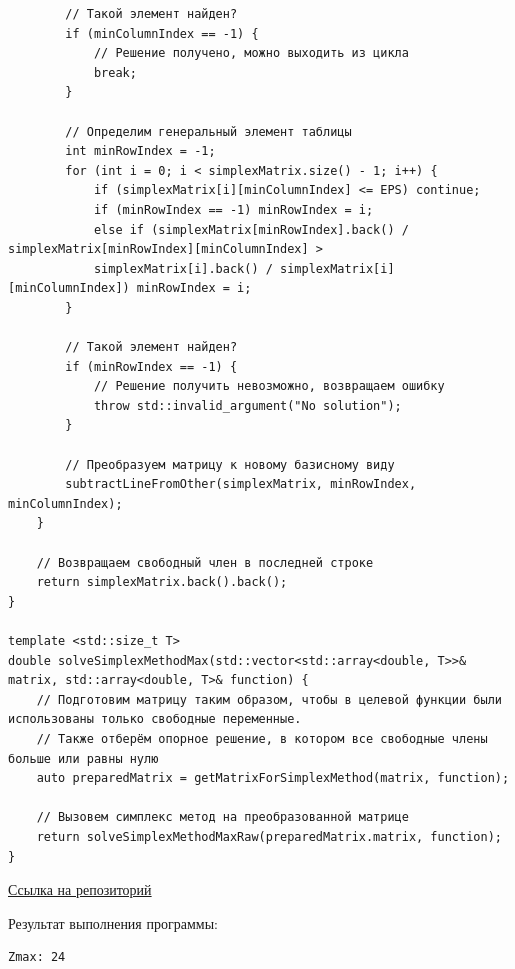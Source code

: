 \documentclass[a4paper,14pt]{extarticle}
\begin{document}
\begin{verbatim}
        // Такой элемент найден?
        if (minColumnIndex == -1) { 
            // Решение получено, можно выходить из цикла
            break;
        }

        // Определим генеральный элемент таблицы
        int minRowIndex = -1;
        for (int i = 0; i < simplexMatrix.size() - 1; i++) {
            if (simplexMatrix[i][minColumnIndex] <= EPS) continue;
            if (minRowIndex == -1) minRowIndex = i;
            else if (simplexMatrix[minRowIndex].back() / simplexMatrix[minRowIndex][minColumnIndex] > 
            simplexMatrix[i].back() / simplexMatrix[i][minColumnIndex]) minRowIndex = i;
        }

        // Такой элемент найден?
        if (minRowIndex == -1) {
            // Решение получить невозможно, возвращаем ошибку
            throw std::invalid_argument("No solution");
        }

        // Преобразуем матрицу к новому базисному виду
        subtractLineFromOther(simplexMatrix, minRowIndex, minColumnIndex);
    }

    // Возвращаем свободный член в последней строке
    return simplexMatrix.back().back();
}

template <std::size_t T>
double solveSimplexMethodMax(std::vector<std::array<double, T>>& matrix, std::array<double, T>& function) {
    // Подготовим матрицу таким образом, чтобы в целевой функции были использованы только свободные переменные. 
    // Также отберём опорное решение, в котором все свободные члены больше или равны нулю
    auto preparedMatrix = getMatrixForSimplexMethod(matrix, function);
    
    // Вызовем симплекс метод на преобразованной матрице
    return solveSimplexMethodMaxRaw(preparedMatrix.matrix, function);
}
    \end{verbatim}
\href{https://github.com/IAmProgrammist/operations_research/blob/master/src/libs/alg/lab2/task.tpp}{Ссылка на репозиторий}\bigbreak

Результат выполнения программы:
\begin{verbatim}
Zmax: 24
\end{verbatim}
\end{document}
